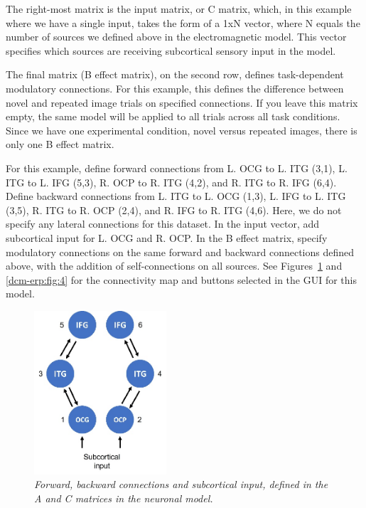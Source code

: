 The right-most matrix is the input matrix, or C matrix, which, in this
example where we have a single input, takes the form of a 1xN vector,
where N equals the number of sources we defined above in the
electromagnetic model. This vector specifies which sources are receiving
subcortical sensory input in the model.

The final matrix (B effect matrix), on the second row, defines
task-dependent modulatory connections. For this example, this defines
the difference between novel and repeated image trials on specified
connections. If you leave this matrix empty, the same model will be
applied to all trials across all task conditions. Since we have one
experimental condition, novel versus repeated images, there is only one
B effect matrix.

For this example, define forward connections from L. OCG to L. ITG
(3,1), L. ITG to L. IFG (5,3), R. OCP to R. ITG (4,2), and R. ITG to R.
IFG (6,4). Define backward connections from L. ITG to L. OCG (1,3), L.
IFG to L. ITG (3,5), R. ITG to R. OCP (2,4), and R. IFG to R. ITG (4,6).
Here, we do not specify any lateral connections for this dataset. In the
input vector, add subcortical input for L. OCG and R. OCP. In the B
effect matrix, specify modulatory connections on the same forward and
backward connections defined above, with the addition of
self-connections on all sources. See Figures~\ref{dcm-erp:fig:3} and
\ref{dcm-erp:fig:4} for the connectivity map and buttons selected in
the GUI for this model.

\begin{figure}
\begin{center}
\includegraphics[width=1.94167in,height=2.39288in]{dcm_erp/figures/A_C_matrices.png}
\caption{\em Forward, backward connections and subcortical input, defined
in the A and C matrices in the neuronal model.\label{dcm-erp:fig:3}}
\end{center}
\end{figure}


